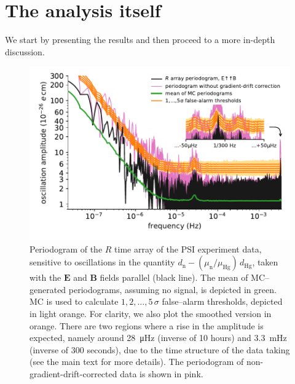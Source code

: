 






\section{The analysis itself}

We start by presenting the results and then proceed to a more in-depth discussion.




\begin{figure}
  \centering
  \includegraphics[width=0.9\linewidth]{gfx/axions/detection_psi_inset_gc.pdf}
  \caption{Periodogram of the $R$ time array of the PSI experiment data, sensitive to oscillations in the quantity $d_\mathrm{n} - \left( \mu_\mathrm{n} / \mu_\mathrm{Hg} \right) \, d_\mathrm{Hg}$, taken with the $\boldsymbol{E}$ and $\boldsymbol{B}$ fields parallel (black line).
  The mean of MC--generated periodograms, assuming no signal, is depicted in green. MC is used to calculate $1,2,…,5\,\sigma$ false--alarm thresholds, depicted in light orange.
  For clarity, we also plot the smoothed version in orange.
  There are two regions where a rise in the amplitude is expected, namely around \SI{28}{\micro\hertz} (inverse of 10 hours) and \SI{3.3}{\milli\hertz} (inverse of 300 seconds), due to the time structure of the data taking (see the main text for more details). The periodogram of non-gradient-drift-corrected data is shown in pink.}
  \label{fig:axions_PSI_detection}
\end{figure}

